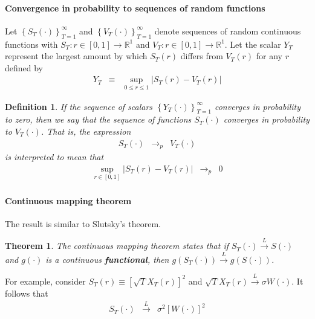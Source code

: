 \documentclass{article}
\newtheorem{theorem}{Theorem}
\newtheorem{definition}{Definition}
\begin{document}
\paragraph{Convergence in probability to sequences of random functions} Let $\left\{S_{T}(\cdot)\right\}_{T=1}^{\infty}$ and $\left\{V_{T}(\cdot)\right\}_{T=1}^{\infty}$ denote sequences of random continuous functions with $S_{T}:r\in [0,1]\to\mathbb{R}^{1}$ and $V_{T}:r\in [0,1]\to\mathbb{R}^{1}$. Let the scalar $Y_{T}$ represent the largest amount by which $S_{T}(r)$ differs from $V_{T}(r)$ for any $r$ defined by
\begin{eqnarray*}
Y_{T}&\equiv&\sup_{0\leq r\leq 1}|S_{T}(r)-V_{T}(r)|
\end{eqnarray*}
\begin{definition}
If the sequence of scalars $\left\{Y_{T}(\cdot)\right\}_{T=1}^{\infty}$ converges in probability to zero, then we say that the sequence of functions $S_{T}(\cdot)$ converges in probability to $V_{T}(\cdot)$. That is, the expression
\begin{eqnarray*}
S_{T}(\cdot)&\to_{p}&V_{T}(\cdot)
\end{eqnarray*}
is interpreted to mean that
\begin{eqnarray*}
\sup_{r\in[0,1]}|S_{T}(r)-V_{T}(r)|&\to_{p}&0
\end{eqnarray*}
\end{definition}


\paragraph{Continuous mapping theorem}
The result is similar to Slutsky's theorem. 
\begin{theorem}
The continuous mapping theorem states that if $S_{T}(\cdot)\xrightarrow{L}S(\cdot)$ and $g(\cdot)$ is a continuous \textbf{functional}, then $g\left(S_{T}(\cdot)\right)\xrightarrow{L}g\left(S(\cdot)\right)$.
\end{theorem}
For example, consider $S_{T}(r)\equiv [\sqrt{T}X_{T}(r)]^{2}$ and $\sqrt{T}X_{T}(r)\xrightarrow{L}\sigma W(\cdot)$. It follows that
\begin{eqnarray*}
S_{T}(\cdot)&\xrightarrow{L}&\sigma^{2}[W(\cdot)]^{2}
\end{eqnarray*}
\end{document}
